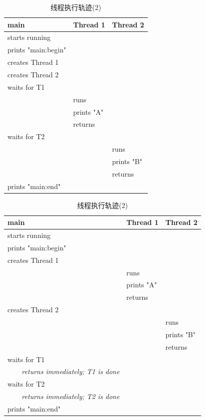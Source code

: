 \begin{table}[p]
\centering
{\scriptsize
\begin{tabular}{p{5cm} l l}
\textbf{main}&\textbf{Thread 1}&\textbf{Thread 2}\\ \midrule[1.1pt]
starts running &  & \\
prints "main:begin" &  & \\
creates Thread 1&  &  \\
creates Thread 2&  &  \\
waits for T1&  &  \\
  & runs &  \\
  & prints "A" &  \\
  & returns &  \\
waits for T2 &  &  \\
  &  & runs \\
  &  & prints "B" \\
  &  & returns \\
prints "main:end" &  &  \\
\end{tabular}}
\caption{\footnotesize 线程执行轨迹(1)}\color{black}\label{tab26-1}

\vspace{0.5cm}
{\scriptsize
\begin{tabular}{p{5cm} l l}
\textbf{main}&\textbf{Thread 1}&\textbf{Thread 2}\\ \midrule[1.1pt]
starts running &  & \\
prints "main:begin" &  & \\
creates Thread 1&  &  \\
  & runs &  \\
  & prints "A" &  \\
  & returns &  \\
creates Thread 2&  &  \\
  &  & runs \\
  &  & prints "B" \\
  &  & returns \\
waits for T1&  &  \\
\textsl{~~~~returns immediately; T1 is done} &  & \\
waits for T2 &  &  \\
\textsl{~~~~returns immediately; T2 is done} &  & \\
prints "main:end" &  &  \\
\end{tabular}}
\caption{{\footnotesize 线程执行轨迹(2)}}\color{black}\label{tab26-1}


\end{table}
